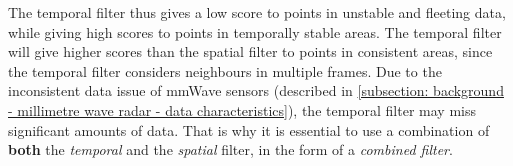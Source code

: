 


The temporal filter thus gives a low score to points in unstable and fleeting data, while giving high scores to points in temporally stable areas.
The temporal filter will give higher scores than the spatial filter to points in consistent areas, since the temporal filter considers neighbours in multiple frames.
Due to the inconsistent data issue of mmWave sensors (described in \cref{subsection: background - millimetre wave radar - data characteristics}), the temporal filter may miss significant amounts of data.
That is why it is essential to use a combination of \textbf{both} the \textit{temporal} and the \textit{spatial} filter, in the form of a \textit{combined filter}.





